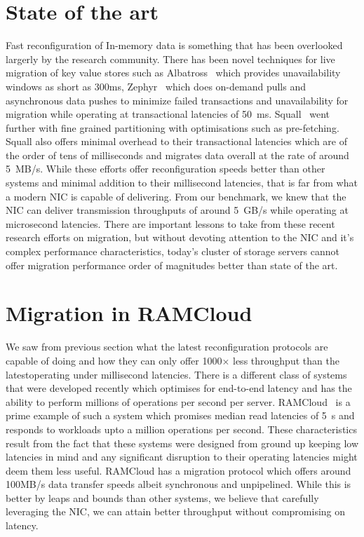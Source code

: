 \section{State of the art}
Fast reconfiguration of In-memory data is something that has been overlooked largerly
by the research community. There has been novel techniques for live migration of 
key value stores such as Albatross~\cite{albatross} which provides unavailability windows 
as short as 300ms, Zephyr~\cite{zephyr} which does on-demand pulls and asynchronous data 
pushes to minimize failed transactions and unavailability for migration while operating 
at transactional latencies of 50~ms. Squall~\cite{squall} went further with fine grained 
partitioning with optimisations such as pre-fetching. Squall also offers minimal overhead 
to their transactional latencies which are of the order of tens of milliseconds and migrates 
data overall at the rate of around 5~MB/s. While these efforts offer reconfiguration speeds 
better than other systems and minimal addition to their millisecond latencies, that is far 
from what a modern NIC is capable of delivering. From our benchmark, we knew that the NIC 
can deliver transmission throughputs of around 5~GB/s while operating at microsecond latencies. 
There are important lessons to take from these recent research efforts on migration, but without 
devoting attention to the NIC and it's complex performance characteristics, today's cluster of
storage servers cannot offer migration performance order of magnitudes better than state of the art.

\section{Migration in RAMCloud}
We saw from previous section what the latest reconfiguration protocols are capable of doing and how they can only 
offer 1000$\times$ less throughput than the latestoperating under millisecond latencies. There is a different class of systems~\cite{ramcloud,farm,rdmabillion,herd} that 
were developed recently which optimises for end-to-end latency and has the ability to perform millions of operations 
per second per server. RAMCloud~\cite{ramcloud} is a prime example of such a system which promises median read latencies 
of 5\textmu~s and responds to workloads upto a million operations per second. These characteristics result from the fact that 
these systems were designed from ground up keeping low latencies in mind and any significant disruption to their operating 
latencies might deem them less useful. RAMCloud has a migration protocol which offers around 100MB/s data transfer speeds albeit 
synchronous and unpipelined. While this is better by leaps and bounds than other systems, we believe that carefully leveraging the NIC, 
we can attain better throughput without compromising on latency.

